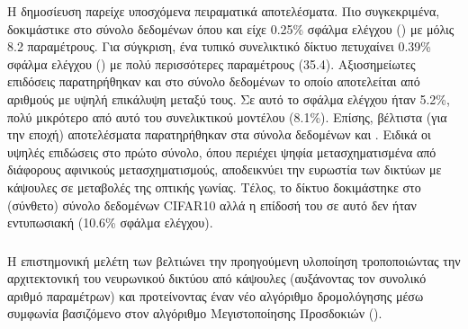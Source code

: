 Η δημοσίευση  παρείχε υποσχόμενα πειραματικά αποτελέσματα. Πιο συγκεκριμένα, δοκιμάστικε στο σύνολο δεδομένων \cite{lecun1998gradientMNIST} όπου και είχε 0.25\% σφάλμα ελέγχου () με μόλις 8.2 παραμέτρους. Για σύγκριση, ένα τυπικό  συνελικτικό δίκτυο πετυχαίνει 0.39\% σφάλμα ελέγχου () με πολύ περισσότερες παραμέτρους (35.4). Αξιοσημείωτες επιδόσεις παρατηρήθηκαν και στο \cite{sabour2017dynamic} σύνολο δεδομένων το οποίο αποτελείται από αριθμούς με υψηλή επικάλυψη μεταξύ τους. Σε αυτό το σφάλμα ελέγχου ήταν 5.2\%, πολύ μικρότερο από αυτό του συνελικτικού μοντέλου (8.1\%). Επίσης, βέλτιστα (για την εποχή) αποτελέσματα παρατηρήθηκαν στα σύνολα δεδομένων  και . Ειδικά οι υψηλές επιδώσεις στο πρώτο σύνολο, όπου περιέχει ψηφία μετασχηματισμένα από διάφορους αφινικούς μετασχηματισμούς, αποδεικνύει την ευρωστία των δικτύων με κάψουλες σε μεταβολές της οπτικής γωνίας. Τέλος, το δίκτυο δοκιμάστηκε στο (σύνθετο) σύνολο δεδομένων CIFAR10 αλλά η επίδοσή του σε αυτό δεν ήταν εντυπωσιακή (10.6\% σφάλμα ελέγχου).

\subsubsection{}

Η επιστημονική μελέτη των \cite{hinton2018matrix} βελτιώνει την προηγούμενη υλοποίηση τροποποιώντας την αρχιτεκτονική του νευρωνικού δικτύου από κάψουλες (αυξάνοντας τον συνολικό αριθμό παραμέτρων) και προτείνοντας έναν νέο αλγόριθμο δρομολόγησης μέσω συμφωνία βασιζόμενο στον αλγόριθμο Μεγιστοποίησης Προσδοκιών (). \par


